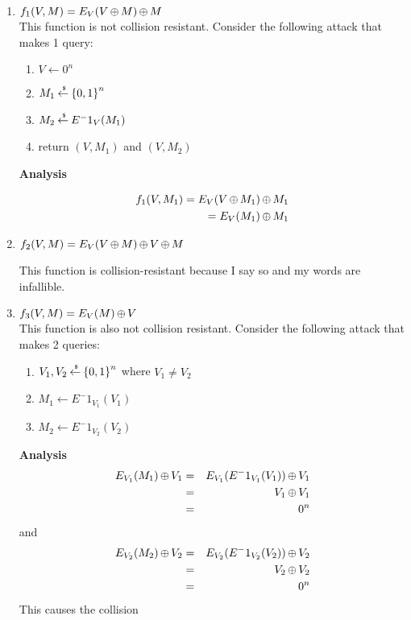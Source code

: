\documentclass[11pt]{article}
\begin{document}
\begin{enumerate}
\item $f_1(V,M) = E_V(V {\,\oplus\,} M) {\,\oplus\,} M $\\

This function is not collision resistant. Consider the following attack that makes 1 query:\\
\begin{enumerate}
\item $V \gets 0^n$
\item $M_1 {\:\stackrel{{\scriptscriptstyle \hspace{0.2em}\$}} {\leftarrow}\:} {\{0,1\}}^n$
\item $M_2 {\:\stackrel{{\scriptscriptstyle \hspace{0.2em}\$}} {\leftarrow}\:} E^-1_V(M_1)$
\item return $(V, M_1)$ and $(V, M_2)$
\end{enumerate}

\textbf{Analysis}

\begin{eqnarray*}
f_1(V, M_1) = E_V(V {\,\oplus\,} M_1) {\,\oplus\,} M_1\\
=E_V(M_1) {\,\oplus\,} M_1
\end{eqnarray*}

\item $f_2(V,M) = E_V(V {\,\oplus\,} M) {\,\oplus\,} V {\,\oplus\,} M$

This function is collision-resistant because I say so and my words are infallible.\\
\item $f_3(V,M) = E_V(M) {\,\oplus\,} V$
\\This function is also not collision resistant. Consider the following attack that makes 2 queries:\\
\begin{enumerate}
\item $V_1, V_2 {\:\stackrel{{\scriptscriptstyle \hspace{0.2em}\$}} {\leftarrow}\:} {\{0,1\}}^n$ where $V_1 \neq V_2$\\
\item $M_1 \gets E^-1_{V_1}(V_1)$\\
\item $M_2 \gets E^-1_{V_2}(V_2)$\\
\end{enumerate}

\textbf{Analysis}
\begin{eqnarray*}
E_{V_1}(M_1) {\,\oplus\,} V_1 &=& E_{V_1}(E^-1_{V_1}(V_1)) {\,\oplus\,} V_1 \\
&=& V_1 {\,\oplus\,} V_1 \\
&=& 0^n\\
\end{eqnarray*}
and
\begin{eqnarray*}
E_{V_2}(M_2) {\,\oplus\,} V_2 &=& E_{V_2}(E^-1_{V_2}(V_2)) {\,\oplus\,} V_2 \\
&=& V_2 {\,\oplus\,} V_2 \\
&=& 0^n\\
\end{eqnarray*}
This causes the collision\\
\end{enumerate}
\end{document}
